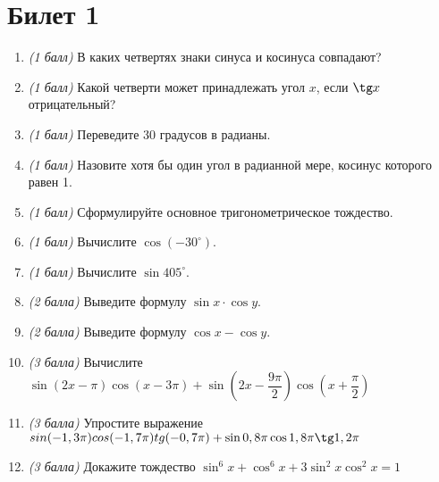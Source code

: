 \documentclass[12pt, a4paper]{article}
\begin{document}
	
	\section*{Билет 1}
	\begin{enumerate}
		\item \textit{(1 балл)} В каких четвертях знаки синуса и косинуса совпадают?
		\item \textit{(1 балл)} Какой четверти может принадлежать угол $x$, если $\tg x$ отрицательный?
		\item \textit{(1 балл)} Переведите 30 градусов в радианы.
		\item \textit{(1 балл)} Назовите хотя бы один угол в радианной мере, косинус которого равен 1.
		\item \textit{(1 балл)} Сформулируйте основное тригонометрическое тождество.
		\item \textit{(1 балл)} Вычислите $\cos (-30^{\circ})$.
		\item \textit{(1 балл)} Вычислите $\sin 405^{\circ}$.
		\item \textit{(2 балла)} Выведите формулу $\sin x \cdot \cos y$.
		\item \textit{(2 балла)} Выведите формулу $\cos x - \cos y$.
		\item \textit{(3 балла)} Вычислите $\sin (2x-\pi)  \cos (x-3\pi)  + \sin (2x-\dfrac{9\pi}{2}) \cos (x+\dfrac{\pi}{2})$
		\item \textit{(3 балла)} Упростите выражение $sin(-1,3\pi)cos(-1,7\pi)tg(-0,7\pi)+\sin 0,8\pi \cos 1,8\pi \tg 1,2\pi$
		\item \textit{(3 балла)} Докажите тождество $\sin^6x + \cos^6x + 3\sin^2x\cos^2x = 1$
	\end{enumerate}
\end{document}
